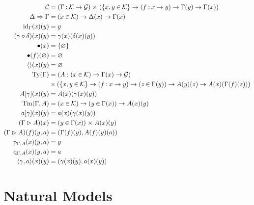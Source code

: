 \documentclass{article}
\renewcommand{\_}{\textrm{\textscale{.5}{\textunderscore}}}
\DeclarePairedDelimiter{\ctxt}{\langle}{\rangle}
\DeclarePairedDelimiter{\set}{\{}{\}}
\newcommand{\Tm}{\mathrm{Tm}}
\newcommand{\Ty}{\mathrm{Ty}}
\newcommand{\id}{\mathrm{id}}
\newcommand{\p}{\mathrm{p}}
\newcommand{\q}{\mathrm{q}}
\newcommand{\Empty}{\mathrm{Empty}}
\newcommand{\Absurd}{\mathrm{absurd}}
\newcommand{\pitype}{\mathrm{Pi}}
\newcommand{\To}{\Rightarrow}
\newcommand{\Fun}[3]{(#1 \mathbin{:} #2) \mathrel{\to} #3}
\newcommand{\Pair}[3]{(#1 \mathbin{:} #2) \mathrel{\times} #3}
\newcommand{\sFun}[3]{(#1 \mathbin{\in} #2) \mathrel{\to} #3}
\newcommand{\isFun}[3]{\{#1 \mathbin{\in} #2\} \mathrel{\to} #3}
\newcommand{\sPair}[3]{(#1 \mathbin{\in} #2) \mathrel{\times} #3}
\theoremstyle{definition}
\theoremstyle{plain}
\begin{document}
\begin{align*}
\mathcal{C} &= \Pair{\Gamma}{\mathcal{K} \to \mathcal{G}}{(\isFun{x, y}{\mathcal{K}}{\Fun{f}{x \to y}{\Gamma(y) \to \Gamma(x)}})} \\
\Delta \To \Gamma &= \sFun{x}{\mathcal{K}}{\Delta(x) \to \Gamma(x)} \\
\id_\Gamma(x)(y) &= y \\
(\gamma \circ \delta)(x)(y) &= \gamma(x)(\delta(x)(y)) \\
\bullet(x) &= \set{\varnothing} \\
\bullet(f)(\varnothing) &= \varnothing \\
\ctxt{}(x)(y) &= \varnothing \\
\Ty(\Gamma) &= (A : \sFun{x}{\mathcal{K}}{\Gamma(x) \to \mathcal{G}}) \\
    &\times (\isFun{x, y}{\mathcal{K}}{\Fun{f}{x \to y}{\sFun{z}{\Gamma(y)}{A(y)(z) \to A(x)(\Gamma(f)(z))}}}) \\
A[\gamma](x)(y) &= A(x)(\gamma(x)(y)) \\
\Tm(\Gamma, A) &= \sFun{x}{\mathcal{K}}{\sFun{y}{\Gamma(x)}{A(x)(y)}} \\
a[\gamma](x)(y) &= a(x)(\gamma(x)(y)) \\
(\Gamma \rhd A)(x) &= \sPair{y}{\Gamma(x)}{A(x)(y)} \\
(\Gamma \rhd A)(f)(y, a) &= (\Gamma(f)(y), A(f)(y)(a)) \\
\p_{\Gamma, A}(x)(y, a) &= y \\
\q_{\Gamma, A}(x)(y, a) &= a \\
\ctxt{\gamma, a}(x)(y) &= (\gamma(x)(y), a(x)(y))
\end{align*}

\iffalse
\begin{align*}
\Empty(\Gamma)(x)(y) &= \varnothing \\
\Empty(\Gamma)(f)(z)(\varnothing) &= \varnothing \\
\Absurd(A, b)(x)(y) &= \mathit{efq}(b(x)(y)) \\
\pitype(A, B)(x)(y) &= \isFun{z}{\mathcal{K}}{\Fun{f}{z \to x}{\sFun{a}{A(z)(\Gamma(f)(y)}{B(z)(\Gamma(f)(y), a)}}} \\
\pitype(A, B)(f)(z)(w)(g)(a) &= w(f \circ g)(a)
\end{align*}
\fi

\section{Natural Models}
\end{document}
